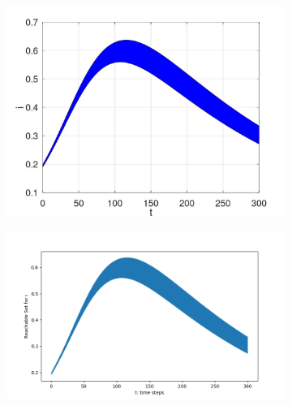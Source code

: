 \documentclass[EPiC]{easychair}
\begin{document}
\begin{figure}[h]
    \begin{subfigure}{0.47\textwidth}
    \centering
    \includegraphics[width=\textwidth]{SapoFigures/SIR/SapoSIR_I.jpg}
    \end{subfigure}
    \begin{subfigure}{0.47\textwidth}
    \centering
    \includegraphics[width=1.2\textwidth,height=0.8\textwidth]{SapoFigures/SIR/KaaSIR_I.png}
    \end{subfigure}
  

\end{figure}
\end{document}
